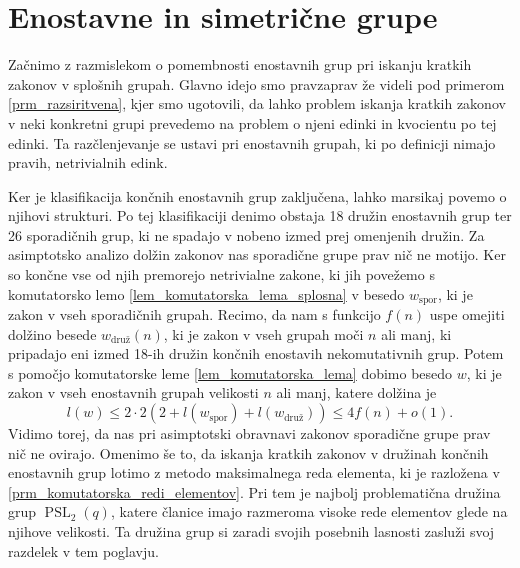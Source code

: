\section{Enostavne in simetrične grupe}



Začnimo z razmislekom o pomembnosti enostavnih grup pri iskanju kratkih zakonov v splošnih grupah. Glavno idejo smo pravzaprav že videli pod primerom \ref{prm_razsiritvena}, kjer smo ugotovili, da
lahko problem iskanja kratkih zakonov v neki konkretni grupi prevedemo na problem o njeni edinki in kvocientu po tej edinki. Ta razčlenjevanje se ustavi pri enostavnih grupah, ki po definicji nimajo pravih, netrivialnih edink.

Ker je klasifikacija končnih enostavnih grup zaključena, lahko marsikaj povemo o njihovi strukturi. Po tej klasifikaciji denimo obstaja 18 družin enostavnih grup ter 26 sporadičnih grup, ki ne spadajo v nobeno izmed prej omenjenih družin.
Za asimptotsko analizo dolžin zakonov nas sporadične grupe prav nič ne motijo. Ker so končne vse od njih premorejo netrivialne zakone, ki jih povežemo s komutatorsko lemo \ref{lem_komutatorska_lema_splosna} v besedo $w_{\text{spor}}$,
ki je zakon v vseh sporadičnih grupah. Recimo, da nam s funkcijo $f(n)$ uspe omejiti dolžino besede $w_{\text{druž}}(n)$, ki je zakon v vseh grupah moči $n$ ali manj, ki pripadajo eni izmed 18-ih družin končnih enostavih nekomutativnih grup.
Potem s pomočjo komutatorske leme \ref{lem_komutatorska_lema} dobimo besedo $w$, ki je zakon v vseh enostavnih grupah velikosti $n$ ali manj, katere dolžina je 
\begin{equation*}
    l(w) \le 2 \cdot 2 (2 + l(w_{\text{spor}}) + l(w_{\text{druž}}) )  \le 4f(n) + o(1).
\end{equation*}
Vidimo torej, da nas pri asimptotski obravnavi zakonov sporadične grupe prav nič ne ovirajo. Omenimo še to, da iskanja kratkih zakonov v družinah končnih enostavnih grup
lotimo z metodo maksimalnega reda elementa, ki je razložena v \ref{prm_komutatorska_redi_elementov}. Pri tem je najbolj problematična družina grup $\operatorname{PSL}_2(q)$,
katere članice imajo razmeroma visoke rede elementov glede na njihove velikosti. Ta družina grup si zaradi svojih posebnih lasnosti zasluži svoj razdelek v tem poglavju.

